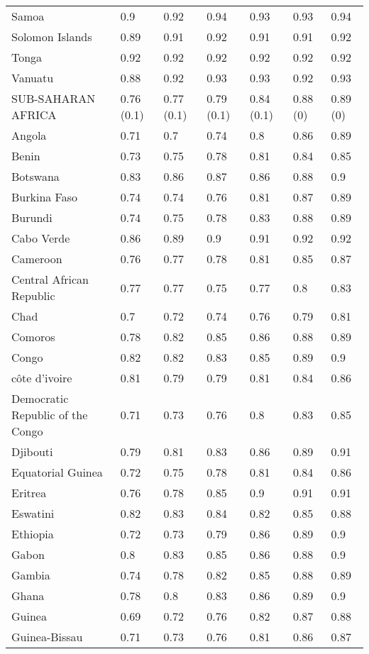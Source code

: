 \begin{longtable}[t]{lllllll}
Samoa & 0.9 & 0.92 & 0.94 & 0.93 & 0.93 & 0.94\\
Solomon Islands & 0.89 & 0.91 & 0.92 & 0.91 & 0.91 & 0.92\\
Tonga & 0.92 & 0.92 & 0.92 & 0.92 & 0.92 & 0.92\\
Vanuatu & 0.88 & 0.92 & 0.93 & 0.93 & 0.92 & 0.93\\
SUB-SAHARAN AFRICA & 0.76 (0.1) & 0.77 (0.1) & 0.79 (0.1) & 0.84 (0.1) & 0.88 (0) & 0.89 (0)\\
Angola & 0.71 & 0.7 & 0.74 & 0.8 & 0.86 & 0.89\\
Benin & 0.73 & 0.75 & 0.78 & 0.81 & 0.84 & 0.85\\
Botswana & 0.83 & 0.86 & 0.87 & 0.86 & 0.88 & 0.9\\
Burkina Faso & 0.74 & 0.74 & 0.76 & 0.81 & 0.87 & 0.89\\
Burundi & 0.74 & 0.75 & 0.78 & 0.83 & 0.88 & 0.89\\
Cabo Verde & 0.86 & 0.89 & 0.9 & 0.91 & 0.92 & 0.92\\
Cameroon & 0.76 & 0.77 & 0.78 & 0.81 & 0.85 & 0.87\\
Central African Republic & 0.77 & 0.77 & 0.75 & 0.77 & 0.8 & 0.83\\
Chad & 0.7 & 0.72 & 0.74 & 0.76 & 0.79 & 0.81\\
Comoros & 0.78 & 0.82 & 0.85 & 0.86 & 0.88 & 0.89\\
Congo & 0.82 & 0.82 & 0.83 & 0.85 & 0.89 & 0.9\\
côte d'ivoire & 0.81 & 0.79 & 0.79 & 0.81 & 0.84 & 0.86\\
Democratic Republic of the Congo & 0.71 & 0.73 & 0.76 & 0.8 & 0.83 & 0.85\\
Djibouti & 0.79 & 0.81 & 0.83 & 0.86 & 0.89 & 0.91\\
Equatorial Guinea & 0.72 & 0.75 & 0.78 & 0.81 & 0.84 & 0.86\\
Eritrea & 0.76 & 0.78 & 0.85 & 0.9 & 0.91 & 0.91\\
Eswatini & 0.82 & 0.83 & 0.84 & 0.82 & 0.85 & 0.88\\
Ethiopia & 0.72 & 0.73 & 0.79 & 0.86 & 0.89 & 0.9\\
Gabon & 0.8 & 0.83 & 0.85 & 0.86 & 0.88 & 0.9\\
Gambia & 0.74 & 0.78 & 0.82 & 0.85 & 0.88 & 0.89\\
Ghana & 0.78 & 0.8 & 0.83 & 0.86 & 0.89 & 0.9\\
Guinea & 0.69 & 0.72 & 0.76 & 0.82 & 0.87 & 0.88\\
Guinea-Bissau & 0.71 & 0.73 & 0.76 & 0.81 & 0.86 & 0.87\\

\end{longtable}

